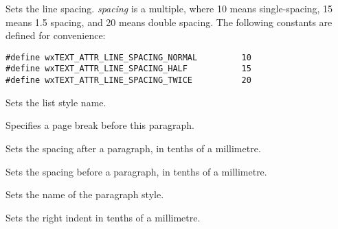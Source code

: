Sets the line spacing. {\it spacing} is a multiple, where 10 means single-spacing,
15 means 1.5 spacing, and 20 means double spacing. The following constants are
defined for convenience:

{\small
\begin{verbatim}
#define wxTEXT_ATTR_LINE_SPACING_NORMAL         10
#define wxTEXT_ATTR_LINE_SPACING_HALF           15
#define wxTEXT_ATTR_LINE_SPACING_TWICE          20
\end{verbatim}
}

\label{wxrichtextattrsetliststylename}


Sets the list style name.

\label{wxrichtextattrsetpagebreak}


Specifies a page break before this paragraph.

\label{wxrichtextattrsetparagraphspacingafter}


Sets the spacing after a paragraph, in tenths of a millimetre.

\label{wxrichtextattrsetparagraphspacingbefore}


Sets the spacing before a paragraph, in tenths of a millimetre.

\label{wxrichtextattrsetparagraphstylename}


Sets the name of the paragraph style.

\label{wxrichtextattrsetrightindent}


Sets the right indent in tenths of a millimetre.

\label{wxrichtextattrsettabs}


